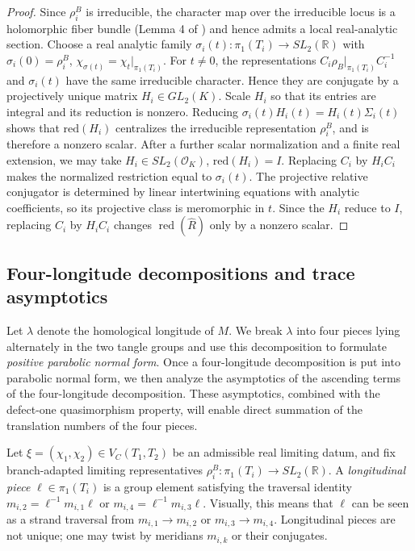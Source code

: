 \documentclass{article}
\theoremstyle{plain}
\theoremstyle{definition}
\theoremstyle{plain}
\theoremstyle{plain}
\theoremstyle{plain}
\theoremstyle{remark}
\theoremstyle{remark}
\theoremstyle{plain}
\theoremstyle{plain}
\theoremstyle{plain}
\theoremstyle{plain}
\begin{document}
\begin{proof}
Since $\rho_i^B$ is irreducible, the character map over the irreducible locus is a holomorphic fiber bundle (Lemma 4 of \cite{paoluzziporti}) and hence admits a local real-analytic section. Choose a real analytic family $\sigma_i(t): \pi_1(T_i) \to SL_2(\mathbb R)$ with $\sigma_i(0) = \rho_i^B$, $\chi_{\sigma(t)} = \chi_t|_{\pi_1(T_i)}$. For $t \neq 0$, the representations $C_i\rho_B|_{\pi_1(T_i)}C_i^{-1}$ and $\sigma_i(t)$ have the same irreducible character. Hence they are conjugate by a projectively unique matrix $H_i \in GL_2(K)$. Scale $H_i$ so that its entries are integral and its reduction is nonzero. Reducing $\sigma_i(t)H_i(t) = H_i(t)\Sigma_i(t)$ shows that $\mathrm{red}(H_i)$ centralizes the irreducible representation $\rho_i^B$, and is therefore a nonzero scalar. After a further scalar normalization and a finite real extension, we may take $H_i \in SL_2(\mathcal O_K)$, $\mathrm{red}(H_i) = I$. Replacing $C_i$ by $H_iC_i$ makes the normalized restriction equal to $\sigma_i(t)$. The projective relative conjugator is determined by linear intertwining equations with analytic coefficients, so its projective class is meromorphic in $t$. Since the $H_i$ reduce to $I$, replacing $C_i$ by $H_iC_i$ changes $\operatorname{red}(\widehat R)$ only by a nonzero scalar.
\end{proof}

\subsection{Four-longitude decompositions and trace asymptotics}

Let $\lambda$ denote the homological longitude of $M$. We break $\lambda$ into four pieces lying alternately in the two tangle groups and use this decomposition to formulate \emph{positive parabolic normal form}. Once a four-longitude decomposition is put into parabolic normal form, we then analyze the asymptotics of the ascending terms of the four-longitude decomposition. These asymptotics, combined with the defect-one quasimorphism property, will enable direct summation of the translation numbers of the four pieces.

\medskip

Let $\xi = (\chi_1, \chi_2) \in V_C(T_1, T_2)$ be an admissible real limiting datum, and fix branch-adapted limiting representatives $\rho_i^B: \pi_1(T_i) \to SL_2(\mathbb R)$. A \emph{longitudinal piece} $\ell \in \pi_1(T_i)$ is a group element satisfying the traversal identity $m_{i, 2} = \ell^{-1}m_{i, 1}\ell$ or $m_{i, 4} = \ell^{-1}m_{i, 3}\ell$. Visually, this means that $\ell$ can be seen as a strand traversal from $m_{i, 1} \to m_{i, 2}$ or $m_{i, 3} \to m_{i, 4}$. Longitudinal pieces are not unique; one may twist by meridians $m_{i, k}$ or their conjugates. 
\end{document}
